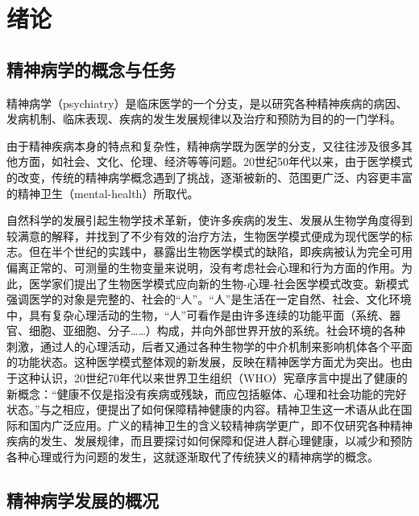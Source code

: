 \chapter{绪论}

\section{精神病学的概念与任务}

精神病学（psychiatry）是临床医学的一个分支，是以研究各种精神疾病的病因、发病机制、临床表现、疾病的发生发展规律以及治疗和预防为目的的一门学科。

由于精神疾病本身的特点和复杂性，精神病学既为医学的分支，又往往涉及很多其他方面，如社会、文化、伦理、经济等等问题。20世纪50年代以来，由于医学模式的改变，传统的精神病学概念遇到了挑战，逐渐被新的、范围更广泛、内容更丰富的精神卫生（mental-health）所取代。

自然科学的发展引起生物学技术革新，使许多疾病的发生、发展从生物学角度得到较满意的解释，并找到了不少有效的治疗方法，生物医学模式便成为现代医学的标志。但在半个世纪的实践中，暴露出生物医学模式的缺陷，即疾病被认为完全可用偏离正常的、可测量的生物变量来说明，没有考虑社会心理和行为方面的作用。为此，医学家们提出了生物医学模式应向新的生物-心理-社会医学模式改变。新模式强调医学的对象是完整的、社会的“人”。“人”是生活在一定自然、社会、文化环境中，具有复杂心理活动的生物，“人”可看作是由许多连续的功能平面（系统、器官、细胞、亚细胞、分子\ldots{}\ldots{}）构成，并向外部世界开放的系统。社会环境的各种刺激，通过人的心理活动，后者又通过各种生物学的中介机制来影响机体各个平面的功能状态。这种医学模式整体观的新发展，反映在精神医学方面尤为突出。也由于这种认识，20世纪70年代以来世界卫生组织（WHO）宪章序言中提出了健康的新概念：“健康不仅是指没有疾病或残缺，而应包括躯体、心理和社会功能的完好状态。”与之相应，便提出了如何保障精神健康的内容。精神卫生这一术语从此在国际和国内广泛应用。广义的精神卫生的含义较精神病学更广，即不仅研究各种精神疾病的发生、发展规律，而且要探讨如何保障和促进人群心理健康，以减少和预防各种心理或行为问题的发生，这就逐渐取代了传统狭义的精神病学的概念。

\section{精神病学发展的概况}

